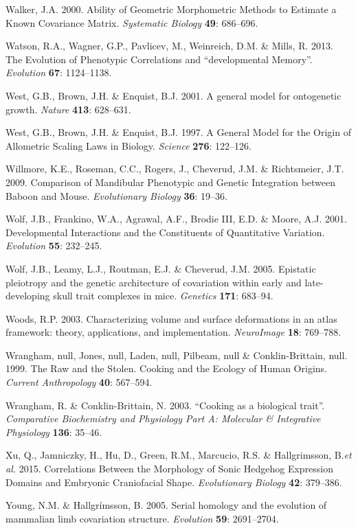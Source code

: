 \documentclass[12pt,twoside]{report}
\begin{document}
Walker, J.A. 2000. Ability of Geometric Morphometric Methods to Estimate
a Known Covariance Matrix. \emph{Systematic Biology} \textbf{49}:
686--696.

Watson, R.A., Wagner, G.P., Pavlicev, M., Weinreich, D.M. \& Mills, R.
2013. The Evolution of Phenotypic Correlations and ``developmental
Memory''. \emph{Evolution} \textbf{67}: 1124--1138.

West, G.B., Brown, J.H. \& Enquist, B.J. 2001. A general model for
ontogenetic growth. \emph{Nature} \textbf{413}: 628--631.

West, G.B., Brown, J.H. \& Enquist, B.J. 1997. A General Model for the
Origin of Allometric Scaling Laws in Biology. \emph{Science}
\textbf{276}: 122--126.

Willmore, K.E., Roseman, C.C., Rogers, J., Cheverud, J.M. \&
Richtsmeier, J.T. 2009. Comparison of Mandibular Phenotypic and Genetic
Integration between Baboon and Mouse. \emph{Evolutionary Biology}
\textbf{36}: 19--36.

Wolf, J.B., Frankino, W.A., Agrawal, A.F., Brodie III, E.D. \& Moore,
A.J. 2001. Developmental Interactions and the Constituents of
Quantitative Variation. \emph{Evolution} \textbf{55}: 232--245.

Wolf, J.B., Leamy, L.J., Routman, E.J. \& Cheverud, J.M. 2005. Epistatic
pleiotropy and the genetic architecture of covariation within early and
late-developing skull trait complexes in mice. \emph{Genetics}
\textbf{171}: 683--94.

Woods, R.P. 2003. Characterizing volume and surface deformations in an
atlas framework: theory, applications, and implementation.
\emph{NeuroImage} \textbf{18}: 769--788.

Wrangham, null, Jones, null, Laden, null, Pilbeam, null \&
Conklin-Brittain, null. 1999. The Raw and the Stolen. Cooking and the
Ecology of Human Origins. \emph{Current Anthropology} \textbf{40}:
567--594.

Wrangham, R. \& Conklin-Brittain, N. 2003. ``Cooking as a biological
trait''. \emph{Comparative Biochemistry and Physiology Part A: Molecular
\& Integrative Physiology} \textbf{136}: 35--46.

Xu, Q., Jamniczky, H., Hu, D., Green, R.M., Marcucio, R.S. \&
Hallgrimsson, B.\emph{et al.} 2015. Correlations Between the Morphology
of Sonic Hedgehog Expression Domains and Embryonic Craniofacial Shape.
\emph{Evolutionary Biology} \textbf{42}: 379--386.

Young, N.M. \& Hallgrímsson, B. 2005. Serial homology and the evolution
of mammalian limb covariation structure. \emph{Evolution} \textbf{59}:
2691--2704.
\end{document}
